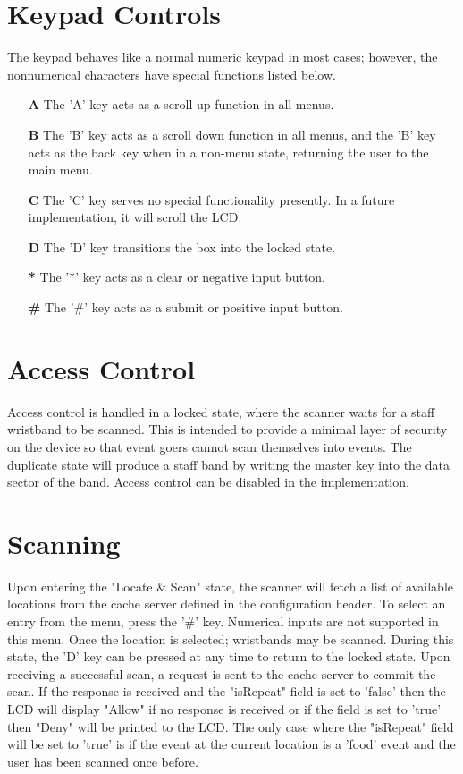 \documentclass{article}
\begin{document}
\section{Keypad Controls}
The keypad behaves like a normal numeric keypad in most cases; however, the nonnumerical characters have special functions listed below.  
\begin{itemize}
	\item[\textbf{A}] The 'A' key acts as a scroll up function in all menus.
	\item[\textbf{B}] The 'B' key acts as a scroll down function in all menus, and the 'B' key acts as the back key when in a non-menu state, returning the user to the main menu.
	\item[\textbf{C}] The 'C' key serves no special functionality presently.  In a future implementation, it will scroll the LCD.
	\item[\textbf{D}] The 'D' key transitions the box into the locked state.
	\item[\textbf{*}] The '*' key acts as a clear or negative input button.  
	\item[\textbf{\#}] The '\#' key acts as a submit or positive input button.
\end{itemize}

\section{Access Control}
Access control is handled in a locked state, where the scanner waits for a staff wristband to be scanned.  This is intended to provide a minimal layer of security on the device so that event goers cannot scan themselves into events.  The duplicate state will produce a staff band by writing the master key into the data sector of the band.  Access control can be disabled in the implementation.

\section{Scanning}
Upon entering the "Locate \& Scan" state, the scanner will fetch a list of available locations from the cache server defined in the configuration header.  To select an entry from the menu, press the '\#' key. Numerical inputs are not supported in this menu.  Once the location is selected; wristbands may be scanned.  During this state, the 'D' key can be pressed at any time to return to the locked state.  Upon receiving a successful scan, a request is sent to the cache server to commit the scan.  If the response is received and the "isRepeat" field is set to 'false' then the LCD will display "Allow" if no response is received or if the field is set to 'true' then "Deny" will be printed to the LCD.  The only case where the "isRepeat" field will be set to 'true' is if the event at the current location is a 'food' event and the user has been scanned once before.  
\end{document}
